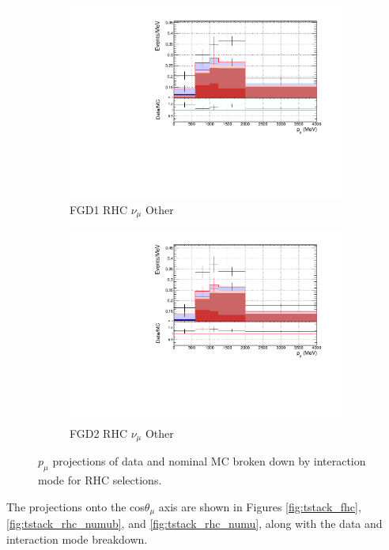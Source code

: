 \begin{figure}[!htbp]
\begin{subfigure}{0.49\textwidth}
  \centering
  \includegraphics[width=\textwidth]{figs/FGD1_NuMuBkg_CCOther_in_AntiNu_Mode_p}
  \caption{FGD1 RHC $\nu_{\mu}$ Other}
\end{subfigure}
\begin{subfigure}{0.49\textwidth}
  \centering
  \includegraphics[width=\textwidth]{figs/FGD2_NuMuBkg_CCOther_in_AntiNu_Mode_p}
  \caption{FGD2 RHC $\nu_{\mu}$ Other}
\end{subfigure}
\caption{$p_{\mu}$ projections of data and nominal MC broken down by interaction mode for RHC \numu selections.}
\label{fig:pstack_rhc_numu}
\end{figure}

The projections onto the cos$\theta_{\mu}$ axis are shown in Figures \ref{fig:tstack_fhc}, \ref{fig:tstack_rhc_numub}, and \ref{fig:tstack_rhc_numu}, along with the data and interaction mode breakdown.

